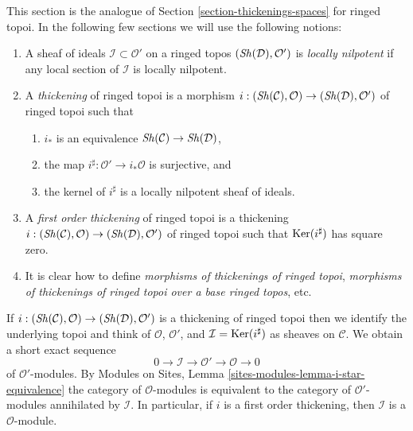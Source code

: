 \noindent
This section is the analogue of Section \ref{section-thickenings-spaces}
for ringed topoi.
In the following few sections we will use the following notions:
\begin{enumerate}
\item A sheaf of ideals $\mathcal{I} \subset \mathcal{O}'$ on
a ringed topos $(\mathop{\mathit{Sh}}\nolimits(\mathcal{D}), \mathcal{O}')$ is {\it locally nilpotent}
if any local section of $\mathcal{I}$ is locally nilpotent.
\item A {\it thickening} of ringed topoi is a morphism
$i : (\mathop{\mathit{Sh}}\nolimits(\mathcal{C}), \mathcal{O}) \to (\mathop{\mathit{Sh}}\nolimits(\mathcal{D}), \mathcal{O}')$
of ringed topoi such that
\begin{enumerate}
\item $i_*$ is an equivalence $\mathop{\mathit{Sh}}\nolimits(\mathcal{C}) \to \mathop{\mathit{Sh}}\nolimits(\mathcal{D})$,
\item the map $i^\sharp : \mathcal{O}' \to i_*\mathcal{O}$
is surjective, and
\item the kernel of $i^\sharp$ is a locally nilpotent sheaf of ideals.
\end{enumerate}
\item A {\it first order thickening} of ringed topoi is a thickening
$i : (\mathop{\mathit{Sh}}\nolimits(\mathcal{C}), \mathcal{O}) \to (\mathop{\mathit{Sh}}\nolimits(\mathcal{D}), \mathcal{O}')$
of ringed topoi such that $\mathop{\mathrm{Ker}}(i^\sharp)$ has square zero.
\item It is clear how to define
{\it morphisms of thickenings of ringed topoi},
{\it morphisms of thickenings of ringed topoi over a base ringed topos}, etc.
\end{enumerate}
If
$i : (\mathop{\mathit{Sh}}\nolimits(\mathcal{C}), \mathcal{O}) \to (\mathop{\mathit{Sh}}\nolimits(\mathcal{D}), \mathcal{O}')$
is a thickening of ringed topoi then we identify the underlying topoi
and think of $\mathcal{O}$, $\mathcal{O}'$, and
$\mathcal{I} = \mathop{\mathrm{Ker}}(i^\sharp)$ as sheaves on $\mathcal{C}$.
We obtain a short exact sequence
$$
0 \to \mathcal{I} \to \mathcal{O}' \to \mathcal{O} \to 0
$$
of $\mathcal{O}'$-modules. By
Modules on Sites, Lemma \ref{sites-modules-lemma-i-star-equivalence}
the category of $\mathcal{O}$-modules is equivalent to the category
of $\mathcal{O}'$-modules annihilated by $\mathcal{I}$. In particular,
if $i$ is a first order thickening, then
$\mathcal{I}$ is a $\mathcal{O}$-module.

